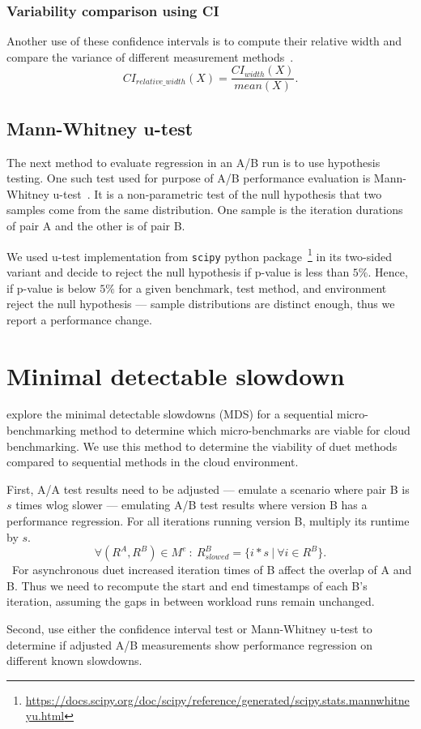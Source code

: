 \subsubsection{Variability comparison using CI}
\label{sec:ci_width}

Another use of these confidence intervals is to compute their relative width and compare the variance of different measurement methods~\cite{bulej2019initial}.
$$
CI_{relative\_width}(X) = \frac{CI_{width}(X)}{mean(X)}.
$$

\subsection{Mann-Whitney u-test}
\label{sec:utest}

The next method to evaluate regression in an A/B run is to use hypothesis testing.
One such test used for purpose of A/B performance evaluation is Mann-Whitney \mbox{u-test}~\cite{bulej2017stat,laaber2019software}.
It is a non-parametric test of the null hypothesis that two samples come from the same distribution.
One sample is the iteration durations of pair A and the other is of pair B.

We used \mbox{u-test} implementation from \lstinline{scipy} python package~\footnote{\url{https://docs.scipy.org/doc/scipy/reference/generated/scipy.stats.mannwhitneyu.html}} in its two-sided variant and decide to reject the null hypothesis if \mbox{p-value} is less than $5\%$.
Hence, if \mbox{p-value} is below $5\%$ for a given benchmark, test method, and environment reject the null hypothesis --- sample distributions are distinct enough, thus we report a performance change.

\section{Minimal detectable slowdown}
\label{sec:mds}

 explore the minimal detectable slowdowns (MDS) for a sequential micro-benchmarking method to determine which micro-benchmarks are viable for cloud benchmarking.
We use this method to determine the viability of duet methods compared to sequential methods in the cloud environment.

First, A/A test results need to be adjusted --- emulate a scenario where pair B is $s$ times wlog slower --- emulating A/B test results where version B has a performance regression.
For all iterations running version B, multiply its runtime by $s$.
$$
\forall (R^A, R^B) \in M^{e} ~:~ R^B_{slowed} = \{i * s~|~\forall i \in R^B \}.
$$\
For asynchronous duet increased iteration times of B affect the overlap of A and B.
Thus we need to recompute the start and end timestamps of each B's iteration, assuming the gaps in between workload runs remain unchanged.

Second, use either the confidence interval test or \mbox{Mann-Whitney} \mbox{u-test} to determine if adjusted A/B measurements show performance regression on different known slowdowns.
